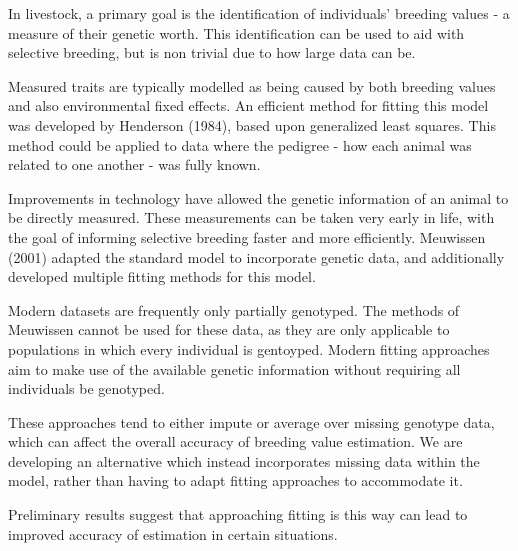 \documentclass[12pt,twoside,a4paper]{article}
\begin{document}
In livestock, a primary goal is the identification of individuals' breeding values - a measure of their genetic worth. This identification can be used to aid with selective breeding, but is non trivial due to how large data can be.

Measured traits are typically modelled as being caused by both breeding values and also environmental fixed effects. An efficient method for fitting this model was developed by Henderson (1984), based upon generalized least squares. This method could be applied to data where the pedigree - how each animal was related to one another - was fully known.

Improvements in technology have allowed the genetic information of an animal to be directly measured. These measurements can be taken very early in life, with the goal of informing selective breeding faster and more efficiently. Meuwissen (2001) adapted the standard model to incorporate genetic data, and additionally developed multiple fitting methods for this model.

Modern datasets are frequently only partially genotyped. The methods of Meuwissen cannot be used for these data, as they are only applicable to populations in which every individual is gentoyped. Modern fitting approaches aim to make use of the available genetic information without requiring all individuals be genotyped.

These approaches tend to either impute or average over missing genotype data, which can affect the overall accuracy of breeding value estimation. We are developing an alternative which instead incorporates missing data within the model, rather than having to adapt fitting approaches to accommodate it.

Preliminary results suggest that approaching fitting is this way can lead to improved accuracy of estimation in certain situations.
\end{document}
